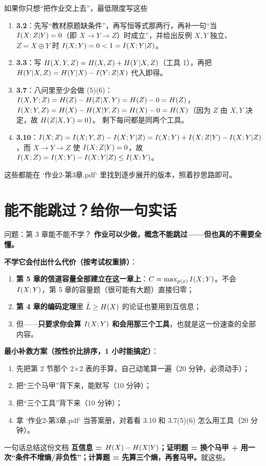 \documentclass[11pt,a4paper]{ctexart}
\begin{document}
\begin{exam}{如果你只想“把作业交上去”，最低限度写这些}
\begin{enumerate}[leftmargin=1.6em,itemsep=2pt,topsep=2pt]
  \item \textbf{3.2}：先写“教材原题缺条件”，再写恒等式那两行，再补一句“当 $I\!\left(X;Z|Y\right)=0$（即 $X\to Y\to Z$）时成立”，并给出反例 $X,Y$ 独立、$Z=X\oplus Y$ 时 $I\!\left(X;Y\right)=0<1=I\!\left(X;Y|Z\right)$。
  \item \textbf{3.3}：写 $H\!\left(X,Y,Z\right)=H\!\left(X,Z\right)+H\!\left(Y|X,Z\right)$（工具 1），再把 $H\!\left(Y|X,Z\right)=H\!\left(Y|X\right)-I\!\left(Y;Z|X\right)$ 代入即得。
  \item \textbf{3.7}：八问里至少会做 (5)(6)：$I\!\left(X,Y;Z\right)=H\!\left(Z\right)-H\!\left(Z|X,Y\right)=H\!\left(Z\right)-0=H\!\left(Z\right)$，
        $I\!\left(X;Y,Z\right)=H\!\left(X\right)-H\!\left(X|Y,Z\right)=H\!\left(X\right)-0=H\!\left(X\right)$（因为 $Z$ 由 $X,Y$ 决定，故 $H\!\left(Z|X,Y\right)=0$）。
        剩下每问都是同两个工具。
  \item \textbf{3.10}：$I\!\left(X;Z\right)=I\!\left(X;Y,Z\right)-I\!\left(X;Y|Z\right)=I\!\left(X;Y\right)+I\!\left(X;Z|Y\right)-I\!\left(X;Y|Z\right)$，而 $X\to Y\to Z$ 使 $I\!\left(X;Z|Y\right)=0$，故 $I\!\left(X;Z\right)=I\!\left(X;Y\right)-I\!\left(X;Y|Z\right)\le I\!\left(X;Y\right)$。
\end{enumerate}
这些都能在 `作业2-第3章.pdf` 里找到逐步展开的版本，照着抄思路即可。
\end{exam}

\section{能不能跳过？给你一句实话}

\begin{qa}{问题：第 3 章能不能不学？}
\textbf{作业可以少做，概念不能跳过——但也真的不需要全懂。}

\textbf{不学它会付出什么代价（按考试权重排）}：
\begin{enumerate}[leftmargin=1.6em,itemsep=1pt,topsep=2pt]
  \item \textbf{第 5 章的信道容量全部建立在这一章上}：$C=\max_{p(x)}I\!\left(X;Y\right)$。不会 $I\!\left(X;Y\right)$，第 5 章的容量题（很可能有大题）直接归零；
  \item \textbf{第 4 章的编码定理}里 $\bar L\ge H\!\left(X\right)$ 的论证也要用到互信息；
  \item 但——\textbf{只要求你会算 $I\!\left(X;Y\right)$ 和会用那三个工具}，也就是这一份速查的全部内容。
\end{enumerate}

\textbf{最小补救方案（按性价比排序，1 小时能搞定）}：
\begin{enumerate}[leftmargin=1.6em,itemsep=1pt,topsep=2pt]
  \item 先把第 2 节那个 2×2 表的手算，自己动笔算一遍（20 分钟，必须动手）；
  \item 把“三个马甲”背下来，能默写（10 分钟）；
  \item 把“三个工具”背下来（10 分钟）；
  \item 拿 `作业2-第3章.pdf` 当答案册，对着看 3.10 和 3.7(5)(6) 怎么用工具（20 分钟）。
\end{enumerate}
\end{qa}

\begin{idea}{一句话总结这份文档}
\textbf{互信息 = $H\!\left(X\right)-H\!\left(X|Y\right)$；证明题 = 换个马甲 + 用一次“条件不增熵/非负性”；计算题 = 先算三个熵，再套马甲。}就这些。
\end{idea}
\end{document}

